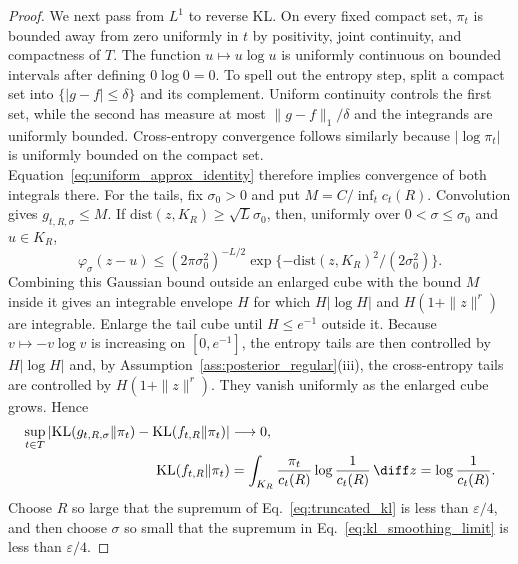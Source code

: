 \begin{proof}
We next pass from $L^1$ to reverse KL.  On every fixed compact set,
$\pi_t$ is bounded away from zero uniformly in $t$ by positivity, joint
continuity, and compactness of $T$.  The function $u\mapsto u\log u$ is
uniformly continuous on bounded intervals after defining $0\log0=0$.
To spell out the entropy step, split a compact set into
$\{|g-f|\le\delta\}$ and its complement.  Uniform continuity controls the
first set, while the second has measure at most
$\|g-f\|_1/\delta$ and the integrands are uniformly bounded.  Cross-entropy
convergence follows similarly because $|\log\pi_t|$ is uniformly bounded on
the compact set.  Equation~\eqref{eq:uniform_approx_identity} therefore
implies convergence of both integrals there.  For the tails, fix
$\sigma_0>0$ and put
$M=C/\inf_tc_t(R)$.  Convolution gives $g_{t,R,\sigma}\le M$.  If
$\mathrm{dist}(z,K_R)\ge\sqrt L\sigma_0$, then, uniformly over
$0<\sigma\le\sigma_0$ and $u\in K_R$,
\[
 \varphi_\sigma(z-u)
 \le (2\pi\sigma_0^2)^{-L/2}
 \exp\{-\mathrm{dist}(z,K_R)^2/(2\sigma_0^2)\}.
\]
Combining this Gaussian bound outside an enlarged cube with the bound $M$
inside it gives an integrable envelope $H$ for which
$H|\log H|$ and $H(1+\|z\|^r)$ are integrable.  Enlarge the tail cube until
$H\le e^{-1}$ outside it.  Because $v\mapsto-v\log v$ is increasing on
$[0,e^{-1}]$, the entropy tails are then controlled by $H|\log H|$ and, by
Assumption~\ref{ass:posterior_regular}(iii), the cross-entropy tails are
controlled by $H(1+\|z\|^r)$.  They vanish uniformly as the enlarged cube
grows.  Hence
\begin{align}
 \sup_{t\in T}\left|
 \mathrm{KL}(g_{t,R,\sigma}\|\pi_t)
 -\mathrm{KL}(f_{t,R}\|\pi_t)\right|&\longrightarrow0,
 \label{eq:kl_smoothing_limit}\\
 \mathrm{KL}(f_{t,R}\|\pi_t)
 &=\int_{K_R}\frac{\pi_t}{c_t(R)}
 \log\frac{1}{c_t(R)}\,\diff z
 =\log\frac1{c_t(R)}.
 \label{eq:truncated_kl}
\end{align}
Choose $R$ so large that the supremum of
Eq.~\eqref{eq:truncated_kl} is less than $\varepsilon/4$, and then choose
$\sigma$ so small that the supremum in
Eq.~\eqref{eq:kl_smoothing_limit} is less than $\varepsilon/4$.


\end{proof}
